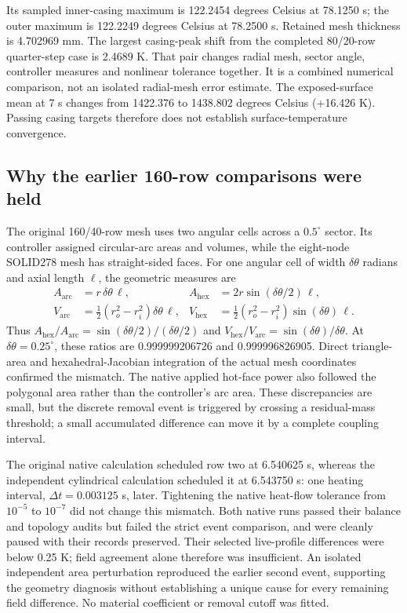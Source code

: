\documentclass[oneside,openany]{amsdtx}
\begin{document}
Its sampled inner-casing maximum is 122.2454 degrees Celsius at 78.1250 s; the outer maximum is 122.2249 degrees Celsius at 78.2500 s. Retained mesh thickness is 4.702969 mm. The largest casing-peak shift from the completed 80/20-row quarter-step case is 2.4689 K. That pair changes radial mesh, sector angle, controller measures and nonlinear tolerance together. It is a combined numerical comparison, not an isolated radial-mesh error estimate. The exposed-surface mean at 7 s changes from 1422.376 to 1438.802 degrees Celsius (+16.426 K). Passing casing targets therefore does not establish surface-temperature convergence.

\subsection{Why the earlier 160-row comparisons were held}
The original 160/40-row mesh uses two angular cells across a $0.5^\circ$ sector.
Its controller assigned circular-arc areas and volumes, while the eight-node
SOLID278 mesh has straight-sided faces. For one angular cell of width
$\delta\theta$ radians and axial length $\ell$, the geometric measures are
\begin{align}
A_{\mathrm{arc}} &= r\,\delta\theta\,\ell,
& A_{\mathrm{hex}} &= 2r\sin(\delta\theta/2)\,\ell,\\
V_{\mathrm{arc}} &= \tfrac12(r_o^2-r_i^2)\delta\theta\,\ell,
& V_{\mathrm{hex}} &= \tfrac12(r_o^2-r_i^2)\sin(\delta\theta)\,\ell.
\end{align}
Thus $A_{\mathrm{hex}}/A_{\mathrm{arc}}=\sin(\delta\theta/2)/(\delta\theta/2)$
and $V_{\mathrm{hex}}/V_{\mathrm{arc}}=\sin(\delta\theta)/\delta\theta$.
At $\delta\theta=0.25^\circ$, these ratios are 0.999999206726 and
0.999996826905. Direct triangle-area and hexahedral-Jacobian integration of
the actual mesh coordinates confirmed the mismatch. The native applied
hot-face power also followed the polygonal area rather than the controller's
arc area. These discrepancies are small, but the discrete removal event is
triggered by crossing a residual-mass threshold; a small accumulated difference
can move it by a complete coupling interval.

The original native calculation scheduled row two at 6.540625 s, whereas the
independent cylindrical calculation scheduled it at 6.543750 s: one heating
interval, $\Delta t=0.003125$ s, later. Tightening the native heat-flow tolerance
from $10^{-5}$ to $10^{-7}$ did not change this mismatch. Both native runs
passed their balance and topology audits but failed the strict event comparison,
and were cleanly paused with their records preserved. Their selected live-profile
differences were below 0.25 K; field agreement alone therefore was insufficient.
An isolated independent area perturbation reproduced the earlier second event,
supporting the geometry diagnosis without establishing a unique cause for every
remaining field difference. No material coefficient or removal cutoff was fitted.
\end{document}

